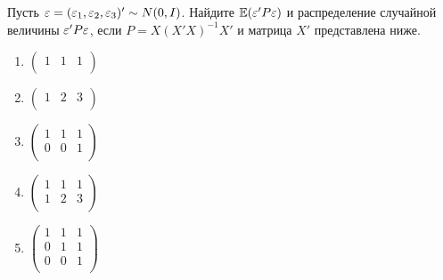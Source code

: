 \documentclass[pdftex,11pt,openany]{book}\usepackage[]{graphicx}\usepackage[]{color}
\begin{document}
\begin{problem}
Пусть $\varepsilon = (\varepsilon_1, \varepsilon_2, \varepsilon_3)'\sim N (0,I)$. Найдите $\mathbb{E}(\varepsilon'P\varepsilon)$ и распределение случайной величины $\varepsilon'P\varepsilon$, если $P = X(X'X)^{-1}X'$ и матрица $X'$ представлена ниже.
\begin{enumerate}
\item
\ensuremath{%
\begin{pmatrix}{}
    1 &   1 &   1 \\ 
  \end{pmatrix}
}

\item
\ensuremath{%
\begin{pmatrix}{}
    1 &   2 &   3 \\ 
  \end{pmatrix}
}

\item
\ensuremath{%
\begin{pmatrix}{}
    1 &   1 &   1 \\ 
    0 &   0 &   1 \\ 
  \end{pmatrix}
}

\item
\ensuremath{%
\begin{pmatrix}{}
    1 &   1 &   1 \\ 
    1 &   2 &   3 \\ 
  \end{pmatrix}
}

\item
\ensuremath{%
\begin{pmatrix}{}
    1 &   1 &   1 \\ 
    0 &   1 &   1 \\ 
    0 &   0 &   1 \\ 
  \end{pmatrix}
}

\end{enumerate}
\end{problem}

\begin{solution}
\end{solution}
\end{document}
